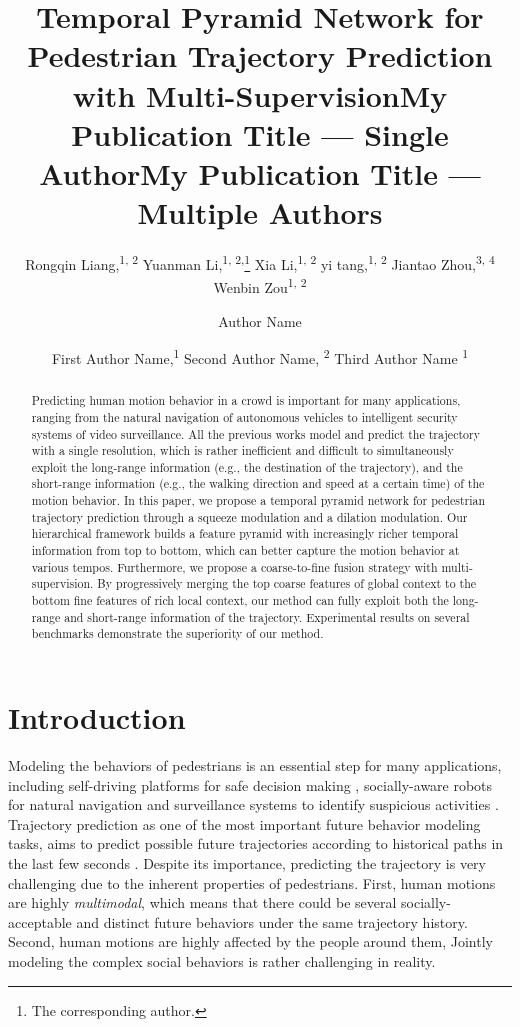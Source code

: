 \documentclass[letterpaper]{article} \usepackage{aaai21}  \usepackage{times}  \usepackage{helvet} \usepackage{courier}  \usepackage[hyphens]{url}  \usepackage{graphicx} \urlstyle{rm} \def\UrlFont{\rm}  \usepackage{natbib}  \usepackage{caption} \frenchspacing  \setlength{\pdfpagewidth}{8.5in}  \setlength{\pdfpageheight}{11in}
\title{Temporal Pyramid Network for Pedestrian Trajectory Prediction with Multi-Supervision}
\author{
Rongqin Liang,\textsuperscript{\rm 1, 2}
    Yuanman Li,\textsuperscript{\rm 1, 2,}\thanks{The corresponding author.}
    Xia Li,\textsuperscript{\rm 1, 2}
    yi tang,\textsuperscript{\rm 1, 2}
    Jiantao Zhou,\textsuperscript{\rm 3, 4}
    Wenbin Zou\textsuperscript{\rm 1, 2} \\
}
\title{My Publication Title --- Single Author}
\author {
Author Name \\
}
\title{My Publication Title --- Multiple Authors}
\author {


        First Author Name,\textsuperscript{\rm 1}
        Second Author Name, \textsuperscript{\rm 2}
        Third Author Name \textsuperscript{\rm 1} \\
}
\begin{document}
\maketitle
\begin{abstract}
Predicting human motion behavior in a crowd is important for many applications, ranging from the natural navigation of autonomous vehicles to intelligent security systems of video surveillance.  
All the previous works model and predict the trajectory with a single resolution, which is rather inefficient and difficult to simultaneously exploit the long-range information (e.g., the destination of the trajectory), and the short-range information (e.g., the walking direction and speed at a certain time) of the motion behavior. 
In this paper, we propose a temporal pyramid network for pedestrian trajectory prediction through a squeeze modulation and a dilation modulation. Our hierarchical framework builds a feature pyramid with increasingly richer temporal information from top to bottom, which can better capture the motion behavior at various tempos. Furthermore, we propose a coarse-to-fine fusion strategy with multi-supervision. By progressively merging the top coarse features of global context to the bottom fine features of rich local context, our method can fully exploit both the long-range and short-range information of the trajectory. 
Experimental results on several benchmarks demonstrate the superiority of our method. 
\end{abstract}

\section{Introduction}
Modeling the behaviors of pedestrians is an essential step for many applications, including self-driving platforms for safe decision making \cite{liang2019peeking}, socially-aware robots for natural navigation \cite{monfort2015intent} and surveillance systems to identify suspicious activities \cite{BastaniTIP2016}. Trajectory prediction as one of the most important future behavior modeling tasks, aims to predict possible future trajectories according to historical paths in the last few seconds \cite{alahi2016social, gupta2018social, mohamed2020social,xu2020AAAI}. Despite its importance, predicting the trajectory is very challenging due to the inherent properties of pedestrians. First, human motions are highly \textit{multimodal}, which means that there could be several socially-acceptable and distinct future behaviors under the same trajectory history. 
Second, human motions are highly affected by the people around them, Jointly modeling the complex social behaviors is rather challenging in reality. 
\end{document}
